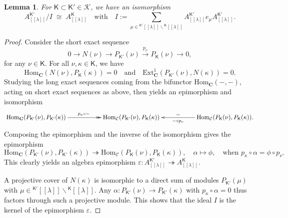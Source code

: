 \documentclass[11pt]{amsart}
\newcommand{\lbra}{[\![}
\newcommand{\rbra}{]\!]}
\newcommand{\cK}{\mathcal{K}}
\newcommand{\KKK}{\mathsf{K}}
\newcommand{\tto}{\twoheadrightarrow}
\newcommand{\bC}{\mathbf{C}}
\newcommand{\Hom}{\mathrm{Hom}}
\newcommand{\Ext}{\mathrm{Ext}}
\newcommand{\cC}{\mathcal{C}}
\numberwithin{equation}{section}
\theoremstyle{plain}
\newtheorem{lemma}[subsubsection]{Lemma}
\theoremstyle{remark}
\theoremstyle{remark}
\theoremstyle{construction}
\begin{document}
\begin{lemma}
For $\KKK\subset \KKK'\in\cK$, we have an isomorphism 
$$A^{\KKK'}_{\lbra\lambda\rbra}/I\;\cong\; A^{\KKK}_{\lbra\lambda\rbra}\quad\mbox{with}\quad I:=\sum_{\mu\in {}^{\KKK'}\lbra\lambda\rbra\backslash{}^{\KKK}\lbra\lambda\rbra }A^{\KKK'}_{\lbra\lambda\rbra}e_\mu A^{\KKK'}_{\lbra\lambda\rbra}.$$
\end{lemma}
\begin{proof}
Consider the short exact sequence 
$$0\to N(\nu)\to P_{\KKK'}(\nu)\stackrel{p_\nu}{\to} P_{\KKK}(\nu)\to0,$$ for any $\nu\in\KKK$. For all $\nu,\kappa\in\KKK$, 
we have
$$\Hom_{\bC}(N(\nu),P_{\KKK}(\kappa))=0\quad\mbox{and}\quad \Ext^1_{\bC}(P_{\KKK'}(\nu),N(\kappa))=0.$$
Studying the long exact sequences coming from the bifunctor $\Hom_{\bC}(-,-)${,} acting on short exact sequences as above{,} then yields an epimorphism and isomorphism
$$\xymatrix{
\Hom_{\bC}(P_{\KKK'}(\nu),P_{\KKK'}(\kappa))\ar@{->>}[rr]^{p_{\kappa}\circ-}&&\Hom_{\cC}(P_{\KKK'}(\nu),P_{\KKK}(\kappa))&&\ar[ll]^{-\circ p_\nu}_{\sim}\Hom_{\cC}(P_{\KKK}(\nu),P_{\KKK}(\kappa)).
\\
}$$
Composing the epimorphism and the inverse of the isomorphism {gives} the epimorphism
$$\Hom_{\bC}(P_{\KKK'}(\nu),P_{\KKK'}(\kappa))\tto \Hom_{\cC}(P_{\KKK}(\nu),P_{\KKK}(\kappa)),\quad \alpha\mapsto \phi,\quad\mbox{when $p_\kappa\circ\alpha=\phi\circ p_\nu$}.$$
This clearly yields an algebra {epi}morphism ${\varepsilon\colon}A^{\KKK'}_{\lbra\lambda\rbra}\tto A^{\KKK}_{\lbra\lambda\rbra}$.

{A} projective cover of $N(\kappa)$ is {isomorphic to} a direct sum of modules $P_{\KKK'}(\mu)$ with $\mu\in {}^{\KKK'}\lbra\lambda\rbra\backslash{}^{\KKK}\lbra\lambda\rbra$. Any $\alpha: P_{\KKK'}(\nu)\to P_{\KKK'}(\kappa)$ with $p_\kappa\circ\alpha=0$ thus factors through such a projective module. This shows that the ideal $I$ is the kernel of the epimorphism {$\varepsilon$}.
\end{proof}
\end{document}
